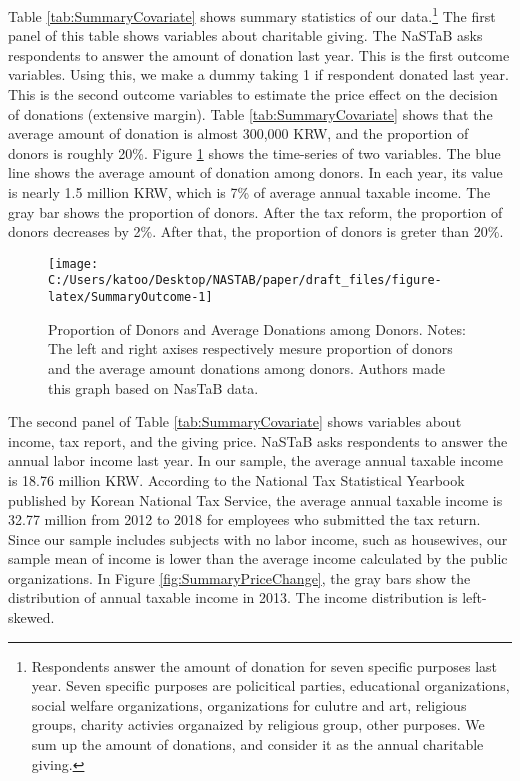 \documentclass[
  11pt,
  a4paper,
]{article}
\begin{document}
Table \ref{tab:SummaryCovariate} shows summary statistics of our data.\footnote{Respondents answer the amount of donation for seven specific purposes last year. Seven specific purposes are policitical parties, educational organizations, social welfare organizations, organizations for culutre and art, religious groups, charity activies organaized by religious group, other purposes. We sum up the amount of donations, and consider it as the annual charitable giving.}
The first panel of this table shows variables about charitable giving.
The NaSTaB asks respondents to answer the amount of donation last year.
This is the first outcome variables.
Using this, we make a dummy taking 1 if respondent donated last year.
This is the second outcome variables to estimate the price effect on the decision of donations (extensive margin).
Table \ref{tab:SummaryCovariate} shows that
the average amount of donation is almost 300,000 KRW,
and the proportion of donors is roughly 20\%.
Figure \ref{fig:SummaryOutcome} shows the time-series of two variables.
The blue line shows the average amount of donation among donors.
In each year, its value is nearly 1.5 million KRW,
which is 7\% of average annual taxable income.
The gray bar shows the proportion of donors.
After the tax reform, the proportion of donors decreases by 2\%.
After that, the proportion of donors is greter than 20\%.

\begin{figure}[t]

{\centering \texttt{[image: C:/Users/katoo/Desktop/NASTAB/paper/draft\_files/figure-latex/SummaryOutcome-1]} 

}

\caption{Proportion of Donors and Average Donations among Donors. Notes: The left and right axises respectively mesure proportion of donors and the average amount donations among donors. Authors made this graph based on NasTaB data.}\label{fig:SummaryOutcome}
\end{figure}

The second panel of Table \ref{tab:SummaryCovariate} shows variables about income, tax report, and the giving price.
NaSTaB asks respondents to answer the annual labor income last year.
In our sample, the average annual taxable income is 18.76 million KRW.
According to the National Tax Statistical Yearbook published by Korean National Tax Service,
the average annual taxable income is 32.77 million from 2012 to 2018
for employees who submitted the tax return.
Since our sample includes subjects with no labor income, such as housewives,
our sample mean of income is lower than the average income calculated by the public organizations.
In Figure \ref{fig:SummaryPriceChange},
the gray bars show the distribution of annual taxable income in 2013.
The income distribution is left-skewed.
\end{document}
